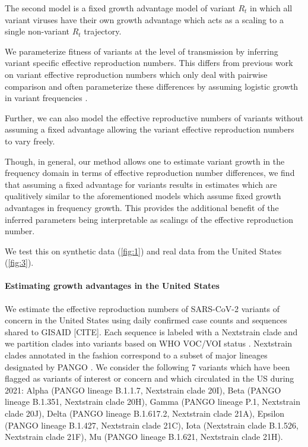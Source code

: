 \documentclass[11pt,oneside,letterpaper]{article}
\begin{document}
The second model is a fixed growth advantage model of variant $R_{t}$ in which all variant viruses have their own growth advantage which acts as a scaling to a single non-variant $R_{t}$ trajectory.

We parameterize fitness of variants at the level of transmission by inferring variant specific effective reproduction numbers. This differs from previous work on variant effective reproduction numbers which only deal with pairwise comparison and often parameterize these differences by assuming logistic growth in variant frequencies \cite{Vhringer2021}. %

Further, we can also model the effective reproductive numbers of variants without assuming a fixed advantage allowing the variant effective reproduction numbers to vary freely. 

Though, in general, our method allows one to estimate variant growth in the frequency domain in terms of effective reproduction number differences, we find that assuming a fixed advantage for variants results in estimates which are qualitively similar to the aforementioned models which assume fixed growth advantages in frequency growth.
This provides the additional benefit of the inferred parameters being interpretable as scalings of the effective reproduction number.

We test this on synthetic data (\ref{fig:1}) and real data from the United States (\ref{fig:3}). %

\paragraph{Estimating growth advantages in the United States}

We estimate the effective reproduction numbers of SARS-CoV-2 variants of concern in the United States using daily confirmed case counts and sequences shared to GISAID [CITE]. %
Each sequence is labeled with a Nextstrain clade \cite{Hadfield2018} and we partition clades into variants based on WHO VOC/VOI status \cite{Konings2021}.
Nextstrain clades annotated in the fashion correspond to a subset of major lineages designated by PANGO \cite{Rambaut2020}.
We consider the following 7 variants which have been flagged as variants of interest or concern and which circulated in the US during 2021: Alpha (PANGO lineage B.1.1.7, Nextstrain clade 20I), Beta (PANGO lineage B.1.351, Nextstrain clade 20H), Gamma (PANGO lineage P.1, Nextstrain clade 20J), Delta (PANGO lineage B.1.617.2, Nextstrain clade 21A), Epsilon (PANGO lineage B.1.427, Nextstrain clade 21C), Iota (Nextstrain clade B.1.526, Nextstrain clade 21F), Mu (PANGO lineage B.1.621, Nextstrain clade 21H).
\end{document}
